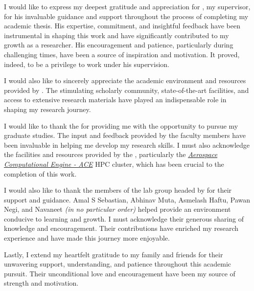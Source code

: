 
\begin{acknowledgements}
  \addchaptertocentry{\acknowledgementname}

  I would like to express my deepest gratitude and appreciation for \supname, my supervisor, for his invaluable guidance and support throughout the process of completing my academic thesis. His expertise, commitment, and insightful feedback have been instrumental in shaping this work and have significantly contributed to my growth as a researcher. His encouragement and patience, particularly during challenging times, have been a source of inspiration and motivation.
  It proved, indeed, to be a privilege to work under his supervision.
  
  I would also like to sincerely appreciate the academic environment and resources provided by \emph{\univname}. The stimulating scholarly community, state-of-the-art facilities, and access to extensive research materials have played an indispensable role in shaping my research journey.
  
  I would like to thank the \emph{\deptname} for providing me with the opportunity to pursue my graduate studies. The input and feedback provided by the faculty members have been invaluable in helping me develop my research skills.
  I must also acknowledge the facilities and resources provided by the \emph{\deptname}, particularly the \href{https://varuna.aero.iitb.ac.in/ace/}{\emph{Aerospace Computational Engine - ACE}} HPC cluster, which has been crucial to the completion of this work.
  
  I would also like to thank the members of the lab group headed by \supname for their support and guidance. Amal S Sebastian, Abhinav Muta, Asmelash Haftu, Pawan Negi, and Navaneet \textit{(in no particular order)} helped provide an environment conducive to learning and growth. I must acknowledge their generous sharing of knowledge and encouragement.
  Their contributions have enriched my research experience and have made this journey more enjoyable.
  
  Lastly, I extend my heartfelt gratitude to my family and friends for their unwavering support, understanding, and patience throughout this academic pursuit. Their unconditional love and encouragement have been my source of strength and motivation.

\end{acknowledgements}